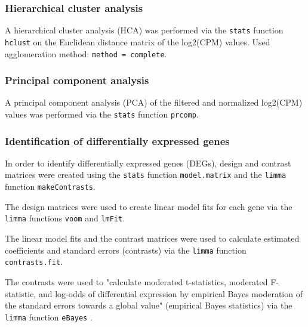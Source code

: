 \subsubsection{Hierarchical cluster analysis}\label{hierarchical-cluster-analysis}

A hierarchical cluster analysis (HCA) was performed via the \verb|stats| function \verb|hclust| on the Euclidean distance matrix of the log2(CPM) values. Used agglomeration method: \verb|method = complete|.

\subsubsection{Principal component analysis}\label{principal-component-analysis}

A principal component analysis (PCA) of the filtered and normalized log2(CPM) values was performed via the \verb|stats| function \verb|prcomp|.

\subsubsection{Identification of differentially expressed genes}

In order to identify differentially expressed genes (DEGs), design and contrast matrices were created using the \verb|stats| function \verb|model.matrix| and the \verb|limma| function \verb|makeContrasts|.

The design matrices were used to create linear model fits for each gene via the \verb|limma| functions \verb|voom| and \verb|lmFit|.

The linear model fits and the contrast matrices were used to calculate estimated coefficients and standard errors (contrasts) via the \verb|limma| function \verb|contrasts.fit|.

The contrasts were used to "calculate moderated t-statistics, moderated F-statistic, and log-odds of differential expression by empirical Bayes moderation of the standard errors towards a global value" (empirical Bayes statistics) via the \verb|limma| function \verb|eBayes| \autocite{R-limma}.

